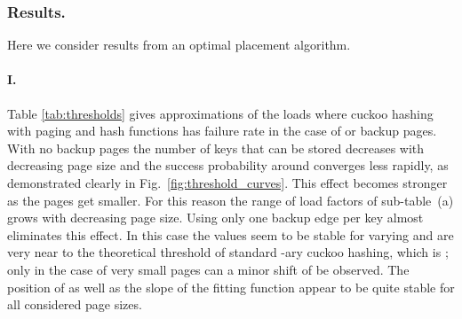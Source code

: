 \let\accentvec\vec \documentclass{llncs}
\begin{document}
\subsubsection{Results.}  Here we consider results from an optimal placement algorithm.


\paragraph{I.}Table \ref{tab:thresholds} gives approximations of the loads where cuckoo hashing with paging and  hash functions has failure rate  in the case of  or  backup pages. With no backup pages the number of keys that can be stored decreases with decreasing page size and the success probability around  converges less rapidly, as demonstrated clearly in Fig.~\ref{fig:threshold_curves}. This effect becomes stronger as the pages get smaller. For this reason the range of load factors  of sub-table~(a) grows with decreasing page size. Using only one backup edge per key almost eliminates this effect.
In this case the values  seem to be stable for varying  and are very near to the theoretical threshold of standard -ary cuckoo hashing, which is ; only in the case of very small pages  can a minor shift of  be observed. 
The position of  as well as the slope of the fitting function appear to be quite stable for all considered page sizes. 
\end{document}
